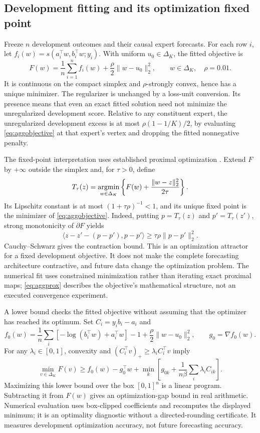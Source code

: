 \documentclass[11pt,a4paper]{article}
\theoremstyle{definition}\newtheorem{definition}[theorem]{Definition}
\begin{document}
\subsection{Development fitting and its optimization fixed point}
Freeze $n$ development outcomes and their causal expert forecasts. For each row $i$, let $f_i(w)=s(a_i^\top w,b_i^\top w;y_i)$. With uniform $u_0\in\Delta_K$, the fitted objective is
\begin{equation}
 F(w)=\frac1n\sum_{i=1}^{n}f_i(w)
       +\frac{\rho}{2}\|w-u_0\|_2^2,
 \qquad w\in\Delta_K,\quad \rho=0.01.
 \label{eq:aggobjective}
\end{equation}
It is continuous on the compact simplex and $\rho$-strongly convex, hence has a unique minimizer. The regularizer is unchanged by a loss-unit conversion. Its presence means that even an exact fitted solution need not minimize the unregularized development score. Relative to any constituent expert, the unregularized development excess is at most $\rho(1-1/K)/2$, by evaluating \eqref{eq:aggobjective} at that expert's vertex and dropping the fitted nonnegative penalty.

The fixed-point interpretation uses established proximal optimization \cite{parikh2014proximal}. Extend $F$ by $+\infty$ outside the simplex and, for $\tau>0$, define
\begin{equation}
 T_\tau(z)=\mathop{\rm argmin}_{w\in\Delta_K}
       \left\{F(w)+\frac{\|w-z\|_2^2}{2\tau}\right\}.
 \label{eq:aggprox}
\end{equation}
Its Lipschitz constant is at most $(1+\tau\rho)^{-1}<1$, and its unique fixed point is the minimizer of \eqref{eq:aggobjective}. Indeed, putting $p=T_\tau(z)$ and $p'=T_\tau(z')$, strong monotonicity of $\partial F$ yields
\[
 \langle z-z'-(p-p'),p-p'\rangle
 \ge\tau\rho\|p-p'\|_2^2.
\]
Cauchy--Schwarz gives the contraction bound. This is an optimization attractor for a fixed development objective. It does not make the complete forecasting architecture contractive, and future data change the optimization problem. The numerical fit uses constrained minimization rather than iterating exact proximal maps; \eqref{eq:aggprox} describes the objective's mathematical structure, not an executed convergence experiment.

A lower bound checks the fitted objective without assuming that the optimizer has reached its optimum. Set $C_i=y_ib_i-a_i$ and
\[
 f_0(w)=\frac1n\sum_i[-\log(b_i^\top w)+a_i^\top w]-1
             +\frac{\rho}{2}\|w-u_0\|_2^2,
 \qquad g_0=\nabla f_0(w).
\]
For any $\lambda_i\in[0,1]$, convexity and $(C_i^\top v)_+\ge\lambda_iC_i^\top v$ imply
\begin{equation}
 \min_{v\in\Delta_K}F(v)\ge
 f_0(w)-g_0^\top w+
 \min_k\left[g_{0k}+\frac1{n\beta}\sum_i\lambda_iC_{ik}\right].
 \label{eq:agglower}
\end{equation}
Maximizing this lower bound over the box $[0,1]^n$ is a linear program. Subtracting it from $F(w)$ gives an optimization-gap bound in real arithmetic. Numerical evaluation uses box-clipped coefficients and recomputes the displayed minimum; it is an optimality diagnostic without a directed-rounding certificate. It measures development optimization accuracy, not future forecasting accuracy.
\end{document}
